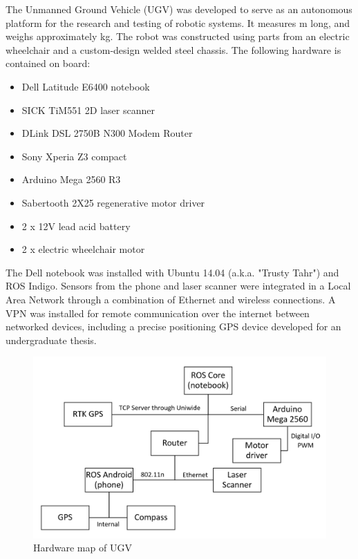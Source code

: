\documentclass[titlepage,12pt,a4paper]{article}
\begin{document}
The Unmanned Ground Vehicle (UGV) was developed to serve as an autonomous platform for the research and testing of robotic systems. It measures \unit[1]{m} long, and weighs approximately \unit[50]{kg}. The robot was constructed using parts from an electric wheelchair and a custom-design welded steel chassis. The following hardware is contained on board:

\begin{itemize}
	\item Dell Latitude E6400 notebook
	\item SICK TiM551 2D laser scanner
	\item DLink DSL 2750B N300 Modem Router
	\item Sony Xperia Z3 compact
	\item Arduino Mega 2560 R3
	\item Sabertooth 2X25 regenerative motor driver
	\item 2 x 12V lead acid battery
	\item 2 x electric wheelchair motor
\end{itemize}

The Dell notebook was installed with Ubuntu 14.04 (a.k.a. "Trusty Tahr") and ROS Indigo. Sensors from the phone and laser scanner were integrated in a Local Area Network through a combination of Ethernet and wireless connections. A VPN was installed for remote communication over the internet between networked devices, including a precise positioning GPS device developed for an undergraduate thesis.

\begin{figure}[h!]
	\centering
	\includegraphics[scale=0.6]{figures/hardware_chart.png}
	\caption{Hardware map of UGV}
	\label{figure:hardware_chart}
\end{figure}
\pagebreak
\end{document}
